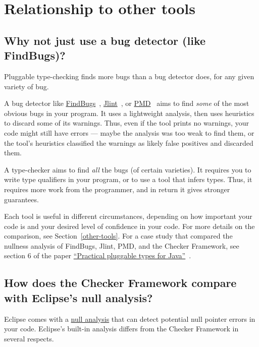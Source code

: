 \section{Relationship to other tools\label{faq-other-tools-section}}


\subsection{Why not just use a bug detector (like FindBugs)?\label{faq-type-checking-vs-bug-detectors}}

Pluggable type-checking finds more bugs than a bug detector does, for any
given variety of bug.

A bug detector like \href{http://findbugs.sourceforge.net/}{FindBugs}~\cite{HovemeyerP2004,HovemeyerSP2005},
\href{http://jlint.sourceforge.net/}{Jlint}~\cite{Artho2001}, or
\href{https://pmd.github.io/}{PMD}~\cite{Copeland2005} aims to find \emph{some}
of the most obvious bugs in your program.  It uses a lightweight analysis,
then uses heuristics to discard some of its warnings.  Thus, even if the tool
prints no warnings, your code might still have errors --- maybe the
analysis was too weak to find them, or the tool's heuristics classified the
warnings as likely false positives and discarded them.

A type-checker aims to find \emph{all} the bugs (of certain varieties).
It requires you to write type qualifiers in your program, or to use a tool
that infers types.  Thus, it requires more work from the programmer, and in
return it gives stronger guarantees.

Each tool is useful in different circumstances, depending on how important
your code is and your desired level of confidence in your code.  For more
details on the comparison, see Section~\ref{other-tools}.  For a case study
that compared the nullness analysis of FindBugs, Jlint, PMD, and the
Checker Framework, see section 6 of the paper
\href{http://homes.cs.washington.edu/~mernst/pubs/pluggable-checkers-issta2008.pdf}{``Practical pluggable types for Java''}~\cite{PapiACPE2008}.


\subsection{How does the Checker Framework compare with Eclipse's null analysis?\label{faq-eclipse}}

Eclipse comes with a
\href{http://help.eclipse.org/luna/index.jsp?topic=\%2Forg.eclipse.jdt.doc.user\%2Ftasks\%2Ftask-using_null_annotations.htm}{null analysis} that
can detect potential null pointer errors in your code.  Eclipse's built-in
analysis differs from the Checker Framework in several respects.

